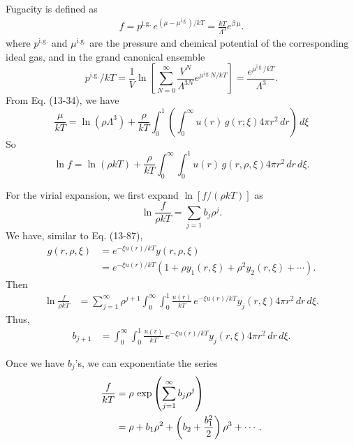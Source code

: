 \documentclass[twocolumn, 10pt]{article}
\numberwithin{equation}{section}
\newenvironment{solution}[1][\empty]
{\par\medskip\sffamily
  \textbf{\ifx\empty#1{Solution.}\relax\else{#1}\fi} \ignorespaces}
{\medskip}
\begin{document}
\begin{solution}
  Fugacity is defined as
  \begin{align*}
    f = p^\mathrm{i.g.} \, e^{(\mu - \mu^\mathrm{i.g.})/kT}
      = \frac{ k T } { \Lambda^3 } e^{\beta \, \mu}.
  \end{align*}
  where $p^\mathrm{i.g.}$ and $\mu^\mathrm{i.g.}$
  are the pressure and chemical potential of
  the corresponding ideal gas, and
  in the grand canonical ensemble
  $$
  p^\mathrm{i.g.}/kT
  = \frac{1}{V} \ln \left[
    \sum_{N=0}^\infty \frac{V^N}{\Lambda^{3N}}e^{\mu^\mathrm{i.g.} N/kT}
    \right]
  = \frac{ e^{\mu^\mathrm{i.g.}/kT} }{ \Lambda^3 }.
  $$
  From Eq. (13-34), we have
  \begin{equation}
    \frac{\mu}{kT}
    =
    \ln(\rho\Lambda^3)
    +
    \frac{\rho}{kT}
    \int_0^1
    \left( \int_0^\infty
    u(r) \, g(r; \xi) 4 \pi r^2 \, dr \right) \, d\xi
    \tag{13-34}
  \end{equation}
  So
  \begin{equation*}
    \ln f
    =
    \ln(\rho kT)
    +
    \frac{\rho}{kT}
    \int_0^\infty
    \int_0^1
    u(r) \, g(r, \rho, \xi) 4 \pi r^2 \, dr \, d\xi.
  \end{equation*}

  For the virial expansion, we first expand $\ln[f/(\rho kT)]$ as
  $$
  \ln \frac{ f }{ \rho k T} = \sum_{j=1} b_j \rho^j.
  $$
  We have, similar to Eq. (13-87),
  \begin{align*}
  g(r, \rho, \xi)
    &=
    e^{-\xi u(r)/kT}
    y(r, \rho, \xi)
    \\
    &=
    e^{-\xi u(r)/kT}
    \left(
    1 + \rho y_1(r, \xi)
    + \rho^2 y_2(r, \xi) + \cdots
    \right)
    .
  \end{align*}
  Then
  \begin{align*}
    \ln \frac{ f } { \rho k T }
    &=
    \sum_{j=1}^\infty
    \rho^{j+1}
    \int_0^\infty
    \int_0^1
    \frac{u(r)} {kT} \, e^{-\xi u(r)/kT}
    y_j(r, \xi) 4 \pi r^2 \, dr \, d\xi.
  \end{align*}
  Thus,
  \begin{align*}
    b_{j+1}
    &=
    \int_0^\infty
    \int_0^1
    \frac{u(r)} {kT} \, e^{-\xi u(r)/kT}
    y_j(r, \xi) 4 \pi r^2 \, dr \, d\xi
    .
  \end{align*}

  Once we have $b_j$'s, we can exponentiate the series
  \begin{align}
    \frac{f}{kT}
    &=
    \rho \,
    \exp\left( \sum_{j=1}^\infty b_j\rho^j \right)
    \notag \\
    &=
    \rho + b_1 \rho^2 + \left(b_2 + \frac{b_1^2}{2} \right) \rho^3
    + \cdots
    .
    \label{eq:f_series}
  \end{align}


\end{solution}
\end{document}
